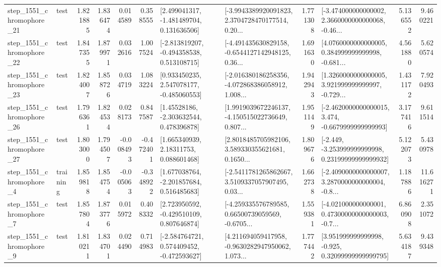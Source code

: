 \begin{tabular}{llrrrrllrlrr}
 step\_1551\_chromophore\_21 &      test &      1.821885 &    1.836474 &      0.014589 &  0.358555 &    [2.499041317, -1.481489704, 0.131636506] &  [-3.9943389920091823, 2.3704728470177514, 0.20... &       1.771308 &  [-3.474000000000002, 2.3660000000000068, -0.46... &            5.136552 &          9.460221 \\
 step\_1551\_chromophore\_22 &      test &      1.847355 &    1.879971 &      0.032616 &  1.007524 &   [-2.813819207, -0.494358538, 0.513108715] &  [-4.491435630829158, -0.6544127142948125, 0.36... &       1.691630 &  [4.0760000000000005, 0.384999999999998, -0.681... &            4.561880 &          5.620574 \\
 step\_1551\_chromophore\_23 &      test &      1.824007 &    1.858726 &      0.034719 &  1.083224 &    [0.933450235, 2.547078177, -0.485060553] &  [-2.016380186258356, -4.072868386058912, 1.008... &       1.942943 &  [1.3260000000000005, 3.921999999999997, -0.729... &            1.431172 &          7.920493 \\
 step\_1551\_chromophore\_26 &      test &      1.796361 &    1.824534 &      0.028173 &  0.847587 &     [1.45528186, -2.303632544, 0.478396878] &  [1.9919039672246137, -4.150515022736649, 0.807... &       1.951149 &  [-2.4620000000000015, 3.474, -0.6679999999999993] &            3.177416 &          9.611514 \\
 step\_1551\_chromophore\_27 &      test &      1.803000 &    1.794507 &     -0.008493 & -0.472401 &      [1.665340939, 2.18311753, 0.088601468] &  [2.8018485705982106, 3.589330355621681, 0.1650... &       1.809676 &  [-2.449, -3.253999999999998, 0.23199999999999932] &            5.122073 &          5.430978 \\
  step\_1551\_chromophore\_4 &  training &      1.859818 &    1.854754 &     -0.005063 & -0.348922 &    [1.677038764, -2.201857684, 0.516485683] &  [-2.5411781265862667, 3.5109337057907495, 0.03... &       1.662738 &  [-2.4090000000000007, 3.2870000000000004, -0.8... &            1.187886 &         11.616271 \\
  step\_1551\_chromophore\_7 &      test &      1.857804 &    1.873776 &      0.015972 &  0.408332 &    [2.723950592, -0.429510109, 0.807646874] &  [-4.259335576789585, 0.66500739059569, -0.6705... &       1.559381 &  [-4.021000000000001, 0.47300000000000003, -0.7... &            6.860908 &          2.351072 \\
  step\_1551\_chromophore\_9 &      test &      1.810211 &    1.834701 &      0.024490 &  0.714983 &   [-2.584764721, 0.574409452, -0.472593627] &  [4.211694059417958, -0.9630282947950062, 1.073... &       1.777442 &   [3.951999999999998, -0.925, 0.32099999999999795] &            5.634187 &          9.439348 \\

\end{tabular}
